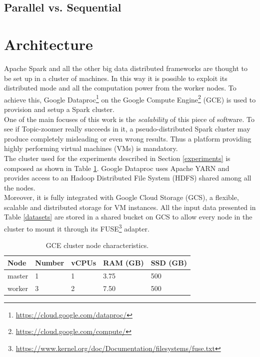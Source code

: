 \documentclass{sig-alternate-05-2015}
\begin{document}
\subsection{Parallel vs. Sequential}

\section{Architecture}
Apache Spark and all the other big data distributed frameworks are thought to be set up in a cluster of machines. In this way it is possible to exploit its distributed mode and all the computation power from the worker nodes. To achieve this, Google Dataproc\footnote{\url{https://cloud.google.com/dataproc/}} on the Google Compute Engine\footnote{\url{https://cloud.google.com/compute/}} (GCE) is used to provision and setup a Spark cluster.\\

One of the main focuses of this work is the \emph{scalability} of this piece of software. To see if Topic-zoomer really succeeds in it, a pseudo-distributed Spark cluster may produce completely misleading or even wrong results. Thus a platform providing highly performing virtual machines (VMs) is mandatory.\\
The cluster used for the experiments described in Section \ref{experiments} is composed as shown in Table \ref{cluster}. Google Dataproc uses Apache YARN and provides access to an Hadoop Distributed File System (HDFS) shared among all the nodes.\\
Moreover, it is fully integrated with Google Cloud Storage (GCS), a flexible, scalable and distributed storage for VM instances. All the input data presented in Table \ref{datasets} are stored in a shared bucket on GCS to allow every node in the cluster to mount it through its FUSE\footnote{\url{https://www.kernel.org/doc/Documentation/filesystems/fuse.txt}} adapter.

\begin{table}[]
    \centering
    \caption{GCE cluster node characteristics.}
    \label{cluster}
    \begin{tabular}{lllll}
    \hline
    Node   & Number & vCPUs & RAM (GB) & SSD (GB) \\
    \hline
    master & 1      & 1     & 3.75     & 500      \\
    worker & 3      & 2     & 7.50     & 500
    \end{tabular}
\end{table}
\end{document}
